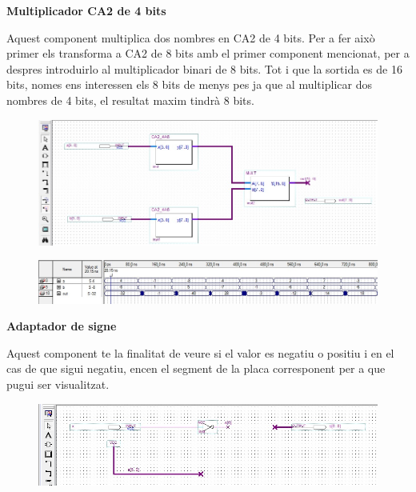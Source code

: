 \documentclass[12pt, a4papre]{article}
\begin{document}
\begin{center}
	
	\textbf{\large{Multiplicador CA2 de 4 bits}}
	
	Aquest component multiplica dos nombres en CA2 de 4 bits. Per a fer això primer els transforma a CA2 de 8 bits amb el primer component mencionat, per a despres introduirlo al multiplicador binari de 8 bits. Tot i que la sortida es de 16 bits, nomes ens interessen els 8 bits de menys pes ja que al multiplicar dos nombres de 4 bits, el resultat maxim tindrà 8 bits.
	
	
	\begin{center}
	\begin{figure}[H]
		\begin{center}
		\includegraphics[width=150mm]{multCA2_4B.jpeg}
		\end{center}
	\end{figure}
	
	\end{center}
	\begin{center}
	\begin{figure}[H]
		\begin{center}
		\includegraphics[width=150mm]{multCA2_4Bsimul.jpeg}
		\end{center}
	\end{figure}
	
	\end{center}
	
	
	\textbf{\large{Adaptador de signe}}
	
	Aquest component te la finalitat de veure si el valor es negatiu o positiu i en el cas de que sigui negatiu, encen el segment de la placa corresponent per a que pugui ser visualitzat.
	
	\begin{center}
	\begin{figure}[H]
		\begin{center}
		\includegraphics[width=150mm]{adaptSigne.jpeg}
		\end{center}
	\end{figure}
	

\end{center}
\end{center}
\end{document}
